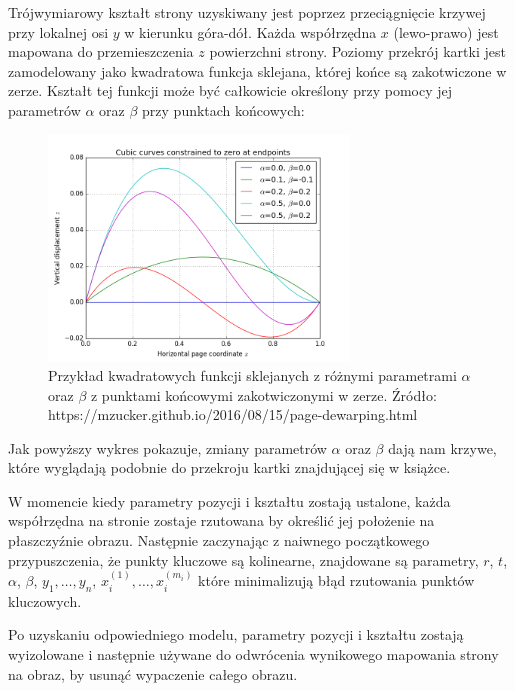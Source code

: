 Trójwymiarowy kształt strony uzyskiwany jest poprzez przeciągnięcie krzywej przy lokalnej osi $y$ w kierunku góra-dół. Każda współrzędna $x$ (lewo-prawo) jest mapowana do przemieszczenia $z$ powierzchni strony. Poziomy przekrój kartki jest zamodelowany jako kwadratowa funkcja sklejana, której końce są zakotwiczone w zerze. Kształt tej funkcji może być całkowicie określony przy pomocy jej parametrów $\alpha$ oraz $\beta$ przy punktach końcowych:

\begin{figure}[h]
	\centering
	\includegraphics[width=8cm]{images/cubic-splines.png}
	\caption{Przykład kwadratowych funkcji sklejanych z różnymi parametrami $\alpha$ oraz $\beta$ z punktami końcowymi zakotwiczonymi w zerze. Źródło: https://mzucker.github.io/2016/08/15/page-dewarping.html}
	\label{fig:cubic-splines}
\end{figure}

Jak powyższy wykres pokazuje, zmiany parametrów $\alpha$ oraz $\beta$ dają nam krzywe, które wyglądają podobnie do przekroju kartki znajdującej się w książce.

W momencie kiedy parametry pozycji i kształtu zostają ustalone, każda współrzędna na stronie zostaje rzutowana by określić jej położenie na płaszczyźnie obrazu. Następnie zaczynając z naiwnego początkowego przypuszczenia, że punkty kluczowe są kolinearne, znajdowane są parametry, $r$, $t$, $\alpha$,  $\beta$, $y_{1},\ldots,y_{n}$, $x_{i}^{(1)},\ldots,x_{i}^{(m_{i})}$ które minimalizują błąd rzutowania punktów kluczowych.

Po uzyskaniu odpowiedniego modelu, parametry pozycji i kształtu zostają wyizolowane i następnie używane do odwrócenia wynikowego mapowania strony na obraz, by usunąć wypaczenie całego obrazu.




